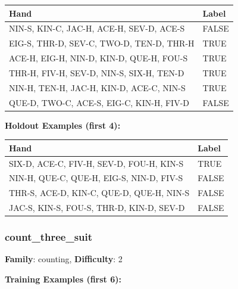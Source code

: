 \documentclass[10pt,a4paper]{article}
\begin{document}
\begin{small}
\begin{tabular}{p{8cm}l}
\toprule
Hand & Label \\
\midrule
NIN-S, KIN-C, JAC-H, ACE-H, SEV-D, ACE-S & \textcolor{negative}{FALSE} \\
EIG-S, THR-D, SEV-C, TWO-D, TEN-D, THR-H & \textcolor{positive}{TRUE} \\
ACE-H, EIG-H, NIN-D, KIN-D, QUE-H, FOU-S & \textcolor{positive}{TRUE} \\
THR-H, FIV-H, SEV-D, NIN-S, SIX-H, TEN-D & \textcolor{positive}{TRUE} \\
NIN-H, TEN-H, JAC-H, KIN-D, ACE-C, NIN-S & \textcolor{positive}{TRUE} \\
QUE-D, TWO-C, ACE-S, EIG-C, KIN-H, FIV-D & \textcolor{negative}{FALSE} \\
\bottomrule
\end{tabular}
\end{small}

\textbf{Holdout Examples (first 4):}

\begin{small}
\begin{tabular}{p{8cm}l}
\toprule
Hand & Label \\
\midrule
SIX-D, ACE-C, FIV-H, SEV-D, FOU-H, KIN-S & \textcolor{positive}{TRUE} \\
NIN-H, QUE-C, QUE-H, EIG-S, NIN-D, FIV-S & \textcolor{negative}{FALSE} \\
THR-S, ACE-D, KIN-C, QUE-D, QUE-H, NIN-S & \textcolor{negative}{FALSE} \\
JAC-S, KIN-S, FOU-S, THR-D, KIN-D, SEV-D & \textcolor{negative}{FALSE} \\
\bottomrule
\end{tabular}
\end{small}

\vspace{0.5cm}

\subsubsection{count\_three\_suit}

\textbf{Family}: counting, \textbf{Difficulty}: 2

\textbf{Training Examples (first 6):}
\end{document}
